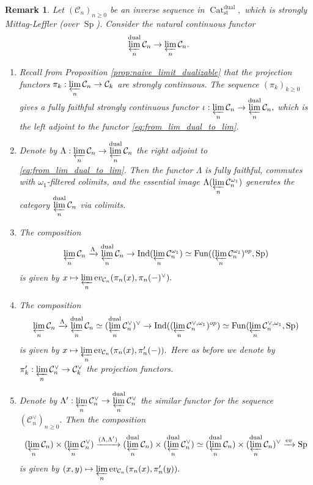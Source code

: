 \documentclass[11pt,leqno]{amsart}
\newtheorem{remark}[theo]{Remark}
\numberwithin{equation}{section}
\newcommand{\prolim}[1][]{\mathop{\varprojlim}\limits_{#1}}
\newcommand{\xto}{\xrightarrow}
\newcommand{\Cat}{\operatorname{Cat}}
\newcommand{\st}{\operatorname{st}}
\newcommand{\dual}{\operatorname{dual}}
\newcommand{\ev}{\mathrm ev}
\newcommand{\cC}{{\mathcal C}}
\newcommand{\Fun}{\operatorname{Fun}}
\newcommand{\Sp}{\operatorname{Sp}}
\newcommand{\Ind}{\operatorname{Ind}}
\begin{document}
\begin{remark}
Let $(\cC_n)_{n\geq 0}$ be an inverse sequence in $\Cat_{\st}^{\dual},$ which is strongly Mittag-Leffler (over $\Sp$). Consider the natural continuous functor
\begin{equation}\label{eq:from_lim_dual_to_lim}
\prolim[n]^{\dual}\cC_n\to \prolim[n]\cC_n.
\end{equation}
\begin{enumerate}[label=(\roman*),ref=(\roman*)]
	\item Recall from Proposition \ref{prop:naive_limit_dualizable} that the projection functors $\pi_k:\prolim[n]\cC_n\to\cC_k$ are strongly continuous. The sequence $(\pi_k)_{k\geq 0}$ gives a fully faithful strongly continuous functor $\iota:\prolim[n]\cC_n\to \prolim[n]^{\dual}\cC_n,$ which is the left adjoint to the functor \eqref{eq:from_lim_dual_to_lim}.
	\item Denote by $\Lambda:\prolim[n]\cC_n\to \prolim[n]^{\dual}\cC_n$ the right adjoint to \eqref{eq:from_lim_dual_to_lim}. Then the functor $\Lambda$ is fully faithful, commutes with $\omega_1$-filtered colimits, and the essential image $\Lambda(\prolim[n]\cC_n^{\omega_1})$ generates the category $\prolim[n]^{\dual}\cC_n$ via colimits.
	\item The composition 
	\begin{equation*}
	\prolim[n]\cC_n\xto{\Lambda}\prolim[n]^{\dual}\cC_n\to \Ind(\prolim[n]\cC_n^{\omega_1})\simeq \Fun((\prolim[n]\cC_n^{\omega_1})^{op},\Sp)	
	\end{equation*} 
	is given by $x\mapsto \prolim[n]\ev_{\cC_n}(\pi_n(x),\pi_n(-)^{\vee}).$
	\item The composition \begin{equation*}
		\prolim[n]\cC_n\xto{\Lambda}\prolim[n]^{\dual}\cC_n\simeq (\prolim[n]^{\dual}\cC_n^{\vee})^{\vee}
		\to \Ind((\prolim[n]\cC_n^{\vee,\omega_1})^{op})\simeq \Fun(\prolim[n]\cC_n^{\vee,\omega_1},\Sp)	
	\end{equation*}
	is given by $x\mapsto \prolim[n]\ev_{\cC_n}(\pi_n(x),\pi_n'(-)).$ Here as before we denote by $\pi_k':\prolim[n]\cC_n^{\vee}\to\cC_k^{\vee}$ the projection functors.
	\item Denote by $\Lambda':\prolim[n]\cC_n^{\vee}\to\prolim[n]^{\dual}\cC_n^{\vee}$ the similar functor for the sequence $(\cC_n^{\vee})_{n\geq 0}.$ Then the composition
	\begin{equation*}
	    (\prolim[n]\cC_n)\times(\prolim[n]\cC_n^{\vee})\xto{(\Lambda,\Lambda')} (\prolim[n]^{\dual}\cC_n)\times(\prolim[n]^{\dual}\cC_n^{\vee})
	    \simeq (\prolim[n]^{\dual}\cC_n)\times(\prolim[n]^{\dual}\cC_n)^{\vee}\xto{\ev}\Sp
	\end{equation*}
	is given by $(x,y)\mapsto \prolim[n]\ev_{\cC_n}(\pi_n(x),\pi_n'(y)).$
\end{enumerate}
\end{remark}
\end{document}

